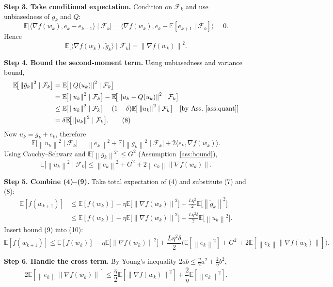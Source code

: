 \documentclass{article}
\newcommand{\E}{\mathbb{E}}
\newcommand{\norm}[1]{\left\|#1\right\|}
\newcommand{\ip}[2]{\langle #1,#2\rangle}
\begin{document}
\noindent\textbf{Step 3. Take conditional expectation.}  
Condition on $\mathcal{F}_k$ and use unbiasedness of $g_k$ and $Q$:
\[
\E\!\big[\ip{\nabla f(w_k)}{e_k-e_{k+1}}\mid\mathcal{F}_k\big]
= \ip{\nabla f(w_k)}{e_k-\E[e_{k+1}\mid\mathcal{F}_k]}=0 . \tag{6}
\]
Hence
\[
\E\!\big[\ip{\nabla f(w_k)}{\tilde g_k}\mid\mathcal{F}_k\big]
 = \norm{\nabla f(w_k)}^{2}. \tag{7}
\]

\noindent\textbf{Step 4. Bound the second‑moment term.}  
Using unbiasedness and variance bound,
\begin{align*}
\E\!\big[\norm{\tilde g_k}^{2}\mid\mathcal{F}_k\big]
&= \E\!\big[\norm{Q(u_k)}^{2}\mid\mathcal{F}_k\big] \\
&= \E\!\big[\norm{u_k}^{2}\mid\mathcal{F}_k\big]
   -\E\!\big[\norm{u_k-Q(u_k)}^{2}\mid\mathcal{F}_k\big] \\
&\le \E\!\big[\norm{u_k}^{2}\mid\mathcal{F}_k\big]
   -(1-\delta)\E\!\big[\norm{u_k}^{2}\mid\mathcal{F}_k\big] \quad\text{[by Ass.~\ref{ass:quant}]}\\
&= \delta \E\!\big[\norm{u_k}^{2}\mid\mathcal{F}_k\big] . \tag{8}
\end{align*}
Now $u_k=g_k+e_k$, therefore
\[
\E\!\big[\norm{u_k}^{2}\mid\mathcal{F}_k\big]
 = \norm{e_k}^{2} + \E\!\big[\norm{g_k}^{2}\mid\mathcal{F}_k\big]
   +2\ip{e_k}{\nabla f(w_k)} .
\]
Using Cauchy–Schwarz and $\E\!\big[\norm{g_k}^{2}\big]\le G^{2}$ (Assumption~\ref{ass:bound}),
\[
\E\!\big[\norm{u_k}^{2}\mid\mathcal{F}_k\big]
 \le \norm{e_k}^{2}+G^{2}+2\norm{e_k}\norm{\nabla f(w_k)} . \tag{9}
\]

\noindent\textbf{Step 5. Combine (4)–(9).}  
Take total expectation of (4) and substitute (7) and (8):
\begin{align*}
\E[f(w_{k+1})]
&\le \E[f(w_k)] -\eta \E\!\big[\norm{\nabla f(w_k)}^{2}\big]
   +\frac{L\eta^{2}}{2}\E\!\big[\norm{\tilde g_k}^{2}\big] \\
&\le \E[f(w_k)] -\eta \E\!\big[\norm{\nabla f(w_k)}^{2}\big]
   +\frac{L\eta^{2}\delta}{2}\E\!\big[\norm{u_k}^{2}\big] . \tag{10}
\end{align*}
Insert bound (9) into (10):
\[
\E[f(w_{k+1})]
\le \E[f(w_k)] -\eta \E\!\big[\norm{\nabla f(w_k)}^{2}\big]
   +\frac{L\eta^{2}\delta}{2}\Big(
        \E[\norm{e_k}^{2}] + G^{2}
        +2\E[\norm{e_k}\norm{\nabla f(w_k)}]\Big). \tag{11}
\]

\noindent\textbf{Step 6. Handle the cross term.}  
By Young’s inequality $2ab\le \frac{\eta}{2}a^{2}+\frac{2}{\eta}b^{2}$,
\[
2\E[\norm{e_k}\norm{\nabla f(w_k)}]
\le \frac{\eta}{2}\E[\norm{\nabla f(w_k)}^{2}]
   +\frac{2}{\eta}\E[\norm{e_k}^{2}]. \tag{12}
\]
\end{document}
